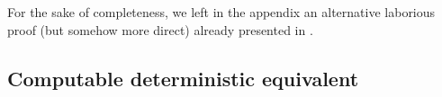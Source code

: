 \documentclass{ws-rmta}
\DeclareMathOperator{\tr}{Tr}
\begin{document}
For the sake of completeness, we left in the appendix an alternative laborious proof (but somehow more direct) already presented in \cite{LOU19}. 


\subsection{Computable deterministic equivalent}\label{sse:equivalent_deterministe_hypothese_convexe}
\end{document}
